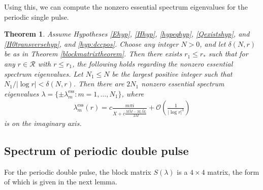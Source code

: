 \documentclass[11pt,reqno]{amsart}
\theoremstyle{plain}
\newtheorem{theorem}{Theorem}
\theoremstyle{definition}
\theoremstyle{remark}
\begin{document}
Using this, we can compute the nonzero essential spectrum eigenvalues for the periodic single pulse. 

\begin{theorem}\label{theorem:1pess}
Assume Hypotheses \ref{Ehyp}, \ref{Hhyp}, \ref{hypeqhyp}, \ref{Qexistshyp}, and \ref{H0transversehyp}, and \ref{hyp:dccpos}. Choose any integer $N > 0$, and let $\delta(N,r)$ be as in Theorem \ref{blockmatrixtheorem}. Then there exists $r_1 \leq r_*$ such that for any $r \in \mathcal{R}$ with $r \leq r_1$, the following holds regarding the nonzero essential spectrum eigenvalues. Let $N_1 \leq N$ be the largest positive integer such that $N_1/|\log r| < \delta(N,r)$. Then there are $2N_1$ nonzero essential spectrum eigenvalues $\lambda = \{ \pm \lambda_m^{\text{ess}} : m = 1, \dots, N_1 \}$, where
\begin{align}\label{1pess}
\lambda_m^{\text{ess}}(r) = c \frac{m \pi i}{X + c \frac{M\tilde{M} - M_c\tilde{M_c}}{2 M}} +  \mathcal{O}\left( \frac{1}{|\log r|^3} \right)
\end{align}
is on the imaginary axis.
\end{theorem}

\subsection{Spectrum of periodic double pulse}\label{sec:perdouble}

For the periodic double pulse, the block matrix $S(\lambda)$ is a $4\times 4$ matrix, the form of which is given in the next lemma.
\end{document}
